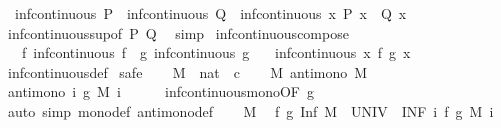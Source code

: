 \begin{isabellebody}
\ \ {\isachardoublequoteopen}inf{\isacharunderscore}continuous\ P\ {\isasymLongrightarrow}\ inf{\isacharunderscore}continuous\ Q\ {\isasymLongrightarrow}\ inf{\isacharunderscore}continuous\ {\isacharparenleft}{\isasymlambda}x{\isachardot}\ P\ x\ {\isasymor}\ Q\ x{\isacharparenright}{\isachardoublequoteclose}\isanewline
%
\isadelimproof
\ \ %
\endisadelimproof
%
\isatagproof
{}\isamarkupfalse%
\ inf{\isacharunderscore}continuous{\isacharunderscore}sup{\isacharbrackleft}of\ P\ Q{\isacharbrackright}\ \isamarkupfalse%
\ simp%
\endisatagproof
{\isafoldproof}%
%
\isadelimproof
\isanewline
%
\endisadelimproof
\isanewline
{}\isamarkupfalse%
\ inf{\isacharunderscore}continuous{\isacharunderscore}compose{\isacharcolon}\isanewline
\ \ \ f{\isacharcolon}\ {\isachardoublequoteopen}inf{\isacharunderscore}continuous\ f{\isachardoublequoteclose}\ \ g{\isacharcolon}\ {\isachardoublequoteopen}inf{\isacharunderscore}continuous\ g{\isachardoublequoteclose}\isanewline
\ \ \ {\isachardoublequoteopen}inf{\isacharunderscore}continuous\ {\isacharparenleft}{\isasymlambda}x{\isachardot}\ f\ {\isacharparenleft}g\ x{\isacharparenright}{\isacharparenright}{\isachardoublequoteclose}\isanewline
%
\isadelimproof
\ \ %
\endisadelimproof
%
\isatagproof
{}\isamarkupfalse%
\ inf{\isacharunderscore}continuous{\isacharunderscore}def\isanewline
{}\isamarkupfalse%
\ safe\isanewline
\ \ \isamarkupfalse%
\ M\ {\isacharcolon}{\isacharcolon}\ {\isachardoublequoteopen}nat\ {\isasymRightarrow}\ {\isacharprime}c{\isachardoublequoteclose}\isanewline
\ \ \isamarkupfalse%
\ M{\isacharcolon}\ {\isachardoublequoteopen}antimono\ M{\isachardoublequoteclose}\isanewline
\ \ \isamarkupfalse%
\ \isamarkupfalse%
\ {\isachardoublequoteopen}antimono\ {\isacharparenleft}{\isasymlambda}i{\isachardot}\ g\ {\isacharparenleft}M\ i{\isacharparenright}{\isacharparenright}{\isachardoublequoteclose}\isanewline
\ \ \ \ \isamarkupfalse%
\ inf{\isacharunderscore}continuous{\isacharunderscore}mono{\isacharbrackleft}OF\ g{\isacharbrackright}\ \isamarkupfalse%
\ {\isacharparenleft}auto\ simp{\isacharcolon}\ mono{\isacharunderscore}def\ antimono{\isacharunderscore}def{\isacharparenright}\isanewline
\ \ \isamarkupfalse%
\ M\ \isamarkupfalse%
\ {\isachardoublequoteopen}f\ {\isacharparenleft}g\ {\isacharparenleft}Inf\ {\isacharparenleft}M\ {\isacharbackquote}\ UNIV{\isacharparenright}{\isacharparenright}{\isacharparenright}\ {\isacharequal}\ {\isacharparenleft}INF\ i{\isachardot}\ f\ {\isacharparenleft}g\ {\isacharparenleft}M\ i{\isacharparenright}{\isacharparenright}{\isacharparenright}{\isachardoublequoteclose}\isanewline

\end{isabellebody}
